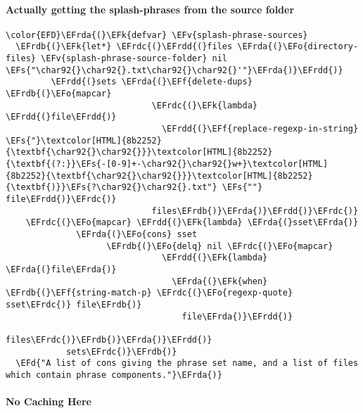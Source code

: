 \documentclass{article}
\newcommand{\EFs}[1]{\textcolor{EFs}{#1}} %
\newcommand{\EFd}[1]{\textcolor{EFd}{#1}} %
\newcommand{\EFk}[1]{\textcolor{EFk}{#1}} %
\newcommand{\EFf}[1]{\textcolor{EFf}{#1}} %
\newcommand{\EFv}[1]{\textcolor{EFv}{#1}} %
\newcommand{\EFo}[1]{\textcolor{EFo}{#1}} %
\newcommand{\EFrda}[1]{\textcolor{EFrda}{#1}} %
\newcommand{\EFrdb}[1]{\textcolor{EFrdb}{#1}} %
\newcommand{\EFrdc}[1]{\textcolor{EFrdc}{#1}} %
\newcommand{\EFrdd}[1]{\textcolor{EFrdd}{#1}} %
\begin{document}
\paragraph{Actually getting the splash-phrases from the source folder}
\label{sec:org4d34ee5}
\begin{Code}
\begin{Verbatim}
\color{EFD}\EFrda{(}\EFk{defvar} \EFv{splash-phrase-sources}
  \EFrdb{(}\EFk{let*} \EFrdc{(}\EFrdd{(}files \EFrda{(}\EFo{directory-files} \EFv{splash-phrase-source-folder} nil \EFs{"\char92{}\char92{}.txt\char92{}\char92{}'"}\EFrda{)}\EFrdd{)}
         \EFrdd{(}sets \EFrda{(}\EFf{delete-dups} \EFrdb{(}\EFo{mapcar}
                             \EFrdc{(}\EFk{lambda} \EFrdd{(}file\EFrdd{)}
                               \EFrdd{(}\EFf{replace-regexp-in-string} \EFs{"}\textcolor[HTML]{8b2252}{\textbf{\char92{}\char92{}}}\textcolor[HTML]{8b2252}{\textbf{(?:}}\EFs{-[0-9]+-\char92{}\char92{}w+}\textcolor[HTML]{8b2252}{\textbf{\char92{}\char92{}}}\textcolor[HTML]{8b2252}{\textbf{)}}\EFs{?\char92{}\char92{}.txt"} \EFs{""} file\EFrdd{)}\EFrdc{)}
                             files\EFrdb{)}\EFrda{)}\EFrdd{)}\EFrdc{)}
    \EFrdc{(}\EFo{mapcar} \EFrdd{(}\EFk{lambda} \EFrda{(}sset\EFrda{)}
              \EFrda{(}\EFo{cons} sset
                    \EFrdb{(}\EFo{delq} nil \EFrdc{(}\EFo{mapcar}
                               \EFrdd{(}\EFk{lambda} \EFrda{(}file\EFrda{)}
                                 \EFrda{(}\EFk{when} \EFrdb{(}\EFf{string-match-p} \EFrdc{(}\EFo{regexp-quote} sset\EFrdc{)} file\EFrdb{)}
                                   file\EFrda{)}\EFrdd{)}
                               files\EFrdc{)}\EFrdb{)}\EFrda{)}\EFrdd{)}
            sets\EFrdc{)}\EFrdb{)}
  \EFd{"A list of cons giving the phrase set name, and a list of files which contain phrase components."}\EFrda{)}

\end{Verbatim}
\end{Code}

\paragraph{No Caching Here}
\label{sec:org651a5ab}
\end{document}
